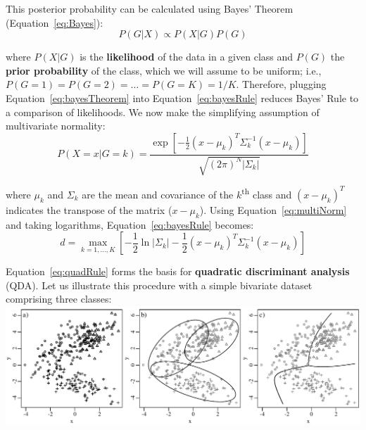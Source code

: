 This posterior probability can be calculated using Bayes' Theorem
(Equation~\ref{eq:Bayes}):
\begin{equation}
  \label{eq:bayesTheorem}
  P(G|X) \propto P(X|G)P(G)
\end{equation}

\noindent where $P(X|G)$ is the \textbf{likelihood} of the data in a
given class and $P(G)$ the \textbf{prior probability} of the class,
which we will assume to be uniform; i.e.,
$P(G=1)=P(G=2)=\ldots=P(G=K)=1/K$.  Therefore, plugging
Equation~\ref{eq:bayesTheorem} into Equation~\ref{eq:bayesRule}
reduces Bayes' Rule to a comparison of likelihoods.  We now make the
simplifying assumption of multivariate normality:
\begin{equation}
  \label{eq:multiNorm}
  P(X=x|G=k) = \frac{\exp \left[ -\frac{1}{2}(x-\mu_k)^T\Sigma_k^{-1}(x-\mu_k) \right]}{\sqrt{(2\pi)^N|\Sigma_k|}}
\end{equation}

\noindent where $\mu_k$ and $\Sigma_k$ are the mean and covariance of
the $k$\textsuperscript{th} class and $(x-\mu_k)^T$ indicates the
transpose of the matrix ($x-\mu_k$).  Using
Equation~\ref{eq:multiNorm} and taking logarithms,
Equation~\ref{eq:bayesRule} becomes:
\begin{equation}
  \label{eq:quadRule}
  d = \underset{k=1,\ldots,K}{\max}
  \left[-\frac{1}{2}\ln|\Sigma_k| -
    \frac{1}{2}(x-\mu_k)^T\Sigma_k^{-1}(x-\mu_k)\right]
\end{equation}

Equation~\ref{eq:quadRule} forms the basis for \textbf{quadratic
  discriminant analysis} (QDA). Let us illustrate this procedure with
a simple bivariate dataset comprising three classes:\\

\noindent\includegraphics[width=\linewidth]{../figures/QDA.pdf}
\begingroup {}
\label{fig:QDA}\endgroup

